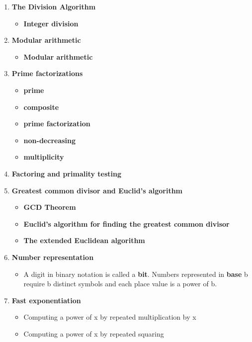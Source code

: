 \documentclass[12pt,a4paper]{article}
\begin{document}
\clearpage
\begin{center}
  \large\textsc{}
\end{center}
\begin{enumerate}
  \item \textbf{The Division Algorithm}
  \begin{itemize}
    \item \textbf{Integer division}
  \end{itemize}
  \item \textbf{Modular arithmetic} 
  \begin{itemize}
    \item \textbf{Modular arithmetic}
  \end{itemize}
  \item \textbf{Prime factorizations}
  \begin{itemize}
    \item \textbf{prime}
    \item \textbf{composite}
    \item \textbf{prime factorization}
    \item \textbf{non-decreasing}
    \item \textbf{multiplicity}
  \end{itemize}
  \item \textbf{Factoring and primality testing}
  \item \textbf{Greatest common divisor and Euclid's algorithm}
  \begin{itemize}
    \item \textbf{GCD Theorem}
    \item \textbf{Euclid's algorithm for finding the greatest common divisor}
    \item \textbf{The extended Euclidean algorithm}
  \end{itemize}
  \item \textbf{Number representation}
  \begin{itemize}
    \item A digit in binary notation is called a \textbf{bit}. Numbers represented in \textbf{base} b require b distinct symbols and each place value is a power of b.
  \end{itemize}
  \item \textbf{Fast exponentiation}
  \begin{itemize}
    \item Computing a power of x by repeated multiplication by x
    \item Computing a power of x by repeated squaring

\end{itemize}
\end{enumerate}
\end{document}
